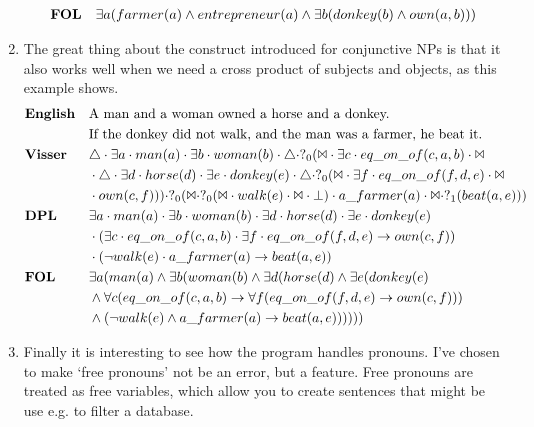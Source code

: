 \documentclass[12pt]{article}
\begin{document}
\begin{enumerate}
\begin{align*}
&\text{\textbf{FOL}}&&\exists a(farmer(a) \wedge entrepreneur(a) \wedge \exists b(donkey(b) \wedge own(a,b))) \\
\end{align*}
\item
The great thing about the construct introduced for conjunctive NPs is that it also works well when we need a cross product of subjects and objects, as this example shows.
\begin{align*}
&\text{\textbf{English}}&&\text{A man and a woman owned a horse and a donkey.}\\&&&\text{If the donkey did not walk, and the man was a farmer, he beat it.} \\
&\text{\textbf{Visser}}&&\triangle \cdot \exists a \cdot man(a) \cdot  \exists b \cdot woman(b) \cdot \triangle \cdot ?_0(\Bowtie \cdot \exists c \cdot eq\_on\_of(c,a,b) \cdot \Bowtie\\&&&\cdot \triangle \cdot \exists d \cdot horse(d) \cdot  \exists e \cdot donkey(e) \cdot \triangle \cdot ?_0(\Bowtie \cdot \exists f \cdot eq\_on\_of(f,d,e) \cdot \Bowtie\\&&&\cdot own(c,f))) \cdot ?_0(\Bowtie \cdot ?_0(\Bowtie \cdot walk(e) \cdot \Bowtie \cdot \bot) \cdot a\_farmer(a) \cdot \Bowtie \cdot ?_1(beat(a,e))) \\
&\text{\textbf{DPL}}&&\exists a \cdot man(a) \cdot \exists b \cdot woman(b) \cdot \exists d \cdot horse(d) \cdot \exists e \cdot donkey(e)\\&&&\cdot (\exists c \cdot eq\_on\_of(c,a,b) \cdot \exists f \cdot eq\_on\_of(f,d,e) \rightarrow own(c,f))\\&&&\cdot (\neg walk(e) \cdot a\_farmer(a) \rightarrow beat(a,e)) \\
&\text{\textbf{FOL}}&&\exists a(man(a) \wedge \exists b(woman(b) \wedge \exists d(horse(d) \wedge \exists e(donkey(e)\\&&&\wedge \forall c(eq\_on\_of(c,a,b) \rightarrow \forall f(eq\_on\_of(f,d,e) \rightarrow own(c,f)))\\&&&\wedge (\neg walk(e) \wedge a\_farmer(a) \rightarrow beat(a,e)))))) \\
\end{align*}
\item
Finally it is interesting to see how the program handles pronouns. I've chosen to make `free pronouns' not be an error, but a feature. Free pronouns are treated as free variables, which allow you to create sentences that might be use e.g. to filter a database.
\begin{align*}

\end{align*}
\end{enumerate}
\end{document}
